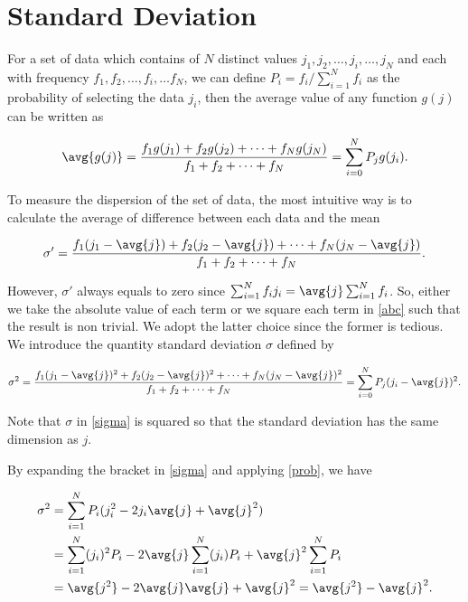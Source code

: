 \documentclass[english,a4paper,12pt]{report}
\begin{document}
\section{Standard Deviation}

For a set of data which contains of \(N\) distinct values \(j_1, j_2, \ldots , j_i, \ldots , j_N\) and each with frequency \(f_1, f_2, \ldots , f_i, \ldots f_N\), we can define \( P_i = f_i / \sum_{i=1}^{N} f_i\) as the probability of selecting the data \(j_i\), then the average value of any function \(g(j)\) can be written as 
	
\begin{equation}
	 \avg{g(j)}  = \frac{f_1 g(j_1) + f_2 g(j_2) + \cdots + f_N g(j_N)}{f_1 + f_2 + \cdots + f_N} = \sum_{i=0}^{N} P_j g(j_i). \label{prob} 
\end{equation}
	
To measure the dispersion of the set of data, the most intuitive way is to calculate the average of difference between each data and the mean

\begin{equation} 
	\sigma' = \frac{f_1(j_1 - \avg{ j }) + f_2(j_2 - \avg{ j }) + \cdots + f_N(j_N - \avg{ j })}{f_1 + f_2 + \cdots + f_N}. \label{abc} 
\end{equation}

However, \(\sigma'\) always equals to zero since \( \sum_{i=1}^{N} f_i j_i = \avg{ j } \sum_{i=1}^{N} f_i \). So, either we take the absolute value of each term or we square each term in \cref{abc} such that the result is non trivial. We adopt the latter choice since the former is tedious. We introduce the quantity standard deviation \(\sigma\) defined by

\begin{equation} 
	\sigma^2 = \frac{f_1(j_1 - \avg{ j })^2 + f_2(j_2 - \avg{ j })^2 + \cdots + f_N(j_N - \avg{ j })^2}{f_1 + f_2 + \cdots + f_N} = \sum_{i=0}^{N} P_j (j_i - \avg{ j })^2. \label{sigma} 
\end{equation}

Note that \(\sigma\) in \cref{sigma} is squared so that the standard deviation has the same dimension as \(j\).

By expanding the bracket in \cref{sigma} and applying \cref{prob}, we have

\begin{equation} 
	\begin{aligned} 
		\sigma^2 &= \sum_{i=1}^{N} P_i (j_i^2 - 2j_i\avg{ j } + \avg{ j }^2) \\ &= \sum_{i=1}^{N} (j_i)^2 P_i - 2 \avg{ j } \sum_{i=1}^{N} (j_i) P_i + \avg{ j }^2 \sum_{i=1}^{N} P_i \\ &= \avg{ j^2 } - 2\avg{ j } \avg{ j } + \avg{ j }^2 = \avg{ j^2 } - \avg{ j }^2. 
	\end{aligned} 
\end{equation}
\end{document}
